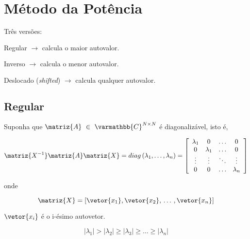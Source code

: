 \section{Método da Potência}

Três versões:

\begin{enumerar}

\item Regular $ \rightarrow $ calcula o maior autovalor.

\item Inverso $ \rightarrow $ calcula o menor autovalor.

\item Deslocado (\textit{shifted}) $ \rightarrow $ calcula qualquer autovalor.

\end{enumerar}

\subsection{Regular}

Suponha que $ \matriz{A} \, \, \in \, \, \varmathbb{C}^{N \times N} $ é diagonalizável, isto é,

\begin{equation}
 \label{cap5:sec4:eq1}
 \matriz{X^{-1}} \matriz{A} \matriz{X} = diag \, (\lambda_1, \ldots, \lambda_n) =
 \left[
 \begin{array}{cccc}
  \lambda_1 & 0         & \ldots & 0\\
  0         & \lambda_1 & \ldots & 0\\
  \vdots    & \vdots    & \ddots & \vdots\\
  0         & 0         & \ldots & \lambda_n\\
 \end{array}
 \right]
\end{equation}

onde

\begin{equation}
 \label{cap5:sec4:eq2}
 \matriz{X} = [\vetor{x_1}, \vetor{x_2}, \, \ldots \, , \vetor{x_n}]
\end{equation}

$ \vetor{x_i} $ é o i-ésimo autovetor.

\begin{equation}
 \label{cap5:sec4:eq3}
 |\lambda_1| > |\lambda_2| \geq |\lambda_3| \geq \ldots \geq |\lambda_n|
\end{equation}

